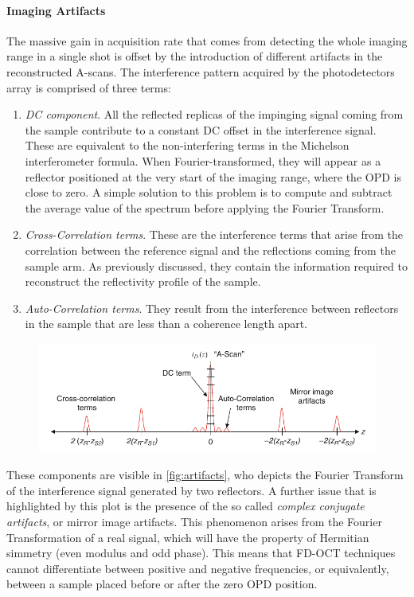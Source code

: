 \paragraph{Imaging Artifacts} The massive gain in acquisition rate that comes from detecting the whole imaging range in a single shot is offset by the introduction of different artifacts in the reconstructed A-scans. The interference pattern acquired by the photodetectors array is comprised of three terms:
\begin{enumerate}
	\item \emph{DC component}. All the reflected replicas of the impinging signal coming from the sample contribute to a constant DC offset in the interference signal. These are equivalent to the non-interfering terms in the Michelson interferometer formula. When Fourier-transformed, they will appear as a reflector positioned at the very start of the imaging range, where the \ac{OPD} is close to zero. A simple solution to this problem is to compute and subtract the average value of the spectrum before applying the Fourier Transform.
	
	\item \emph{Cross-Correlation terms}. These are the interference terms that arise from the correlation between the reference signal and the reflections coming from the sample arm. As previously discussed, they contain the information required to reconstruct the reflectivity profile of the sample. 
	
	\item \emph{Auto-Correlation terms}. They result from the interference between reflectors in the sample that are less than a coherence length apart. 
\end{enumerate}


\begin{figure}[hbt]
	\myfloatalign
	\includegraphics[width=\linewidth]{gfx/ch2/fdoct-artifacts}
	\caption{\cite{Drexler2015}}\label{fig:artifacts}
\end{figure}

These components are visible in \autoref{fig:artifacts}, who depicts the Fourier Transform of the interference signal generated by two reflectors. A further issue that is highlighted by this plot is the presence of the so called \emph{complex conjugate artifacts}, or mirror image artifacts. This phenomenon arises from the Fourier Transformation of a real signal, which will have the property of Hermitian simmetry (even modulus and odd phase). This means that \ac{FD-OCT} techniques cannot differentiate between positive and negative frequencies, or equivalently, between a sample placed before or after the zero \ac{OPD} position. 

